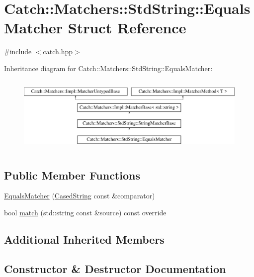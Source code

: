 \hypertarget{struct_catch_1_1_matchers_1_1_std_string_1_1_equals_matcher}{}\section{Catch\+::Matchers\+::Std\+String\+::Equals\+Matcher Struct Reference}
\label{struct_catch_1_1_matchers_1_1_std_string_1_1_equals_matcher}


{\ttfamily \#include $<$catch.\+hpp$>$}

Inheritance diagram for Catch\+::Matchers\+::Std\+String\+::Equals\+Matcher\+:\begin{figure}[H]
\begin{center}
\leavevmode
\includegraphics[height=3.758389cm]{struct_catch_1_1_matchers_1_1_std_string_1_1_equals_matcher}
\end{center}
\end{figure}
\subsection*{Public Member Functions}
\begin{DoxyCompactItemize}
\item 
\mbox{\hyperlink{struct_catch_1_1_matchers_1_1_std_string_1_1_equals_matcher_ab740f1fb2310e9fe3fed5134d4c7e4c8}{Equals\+Matcher}} (\mbox{\hyperlink{struct_catch_1_1_matchers_1_1_std_string_1_1_cased_string}{Cased\+String}} const \&comparator)
\item 
bool \mbox{\hyperlink{struct_catch_1_1_matchers_1_1_std_string_1_1_equals_matcher_a0bb9d64693f7bb1ef7441062d219f21a}{match}} (std\+::string const \&source) const override
\end{DoxyCompactItemize}
\subsection*{Additional Inherited Members}


\subsection{Constructor \& Destructor Documentation}
\mbox{\label{struct_catch_1_1_matchers_1_1_std_string_1_1_equals_matcher_ab740f1fb2310e9fe3fed5134d4c7e4c8}} 
